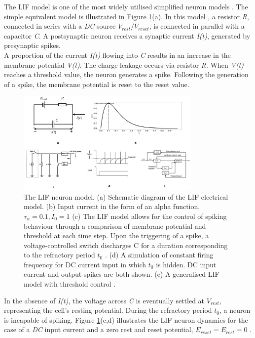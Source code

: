\noindent The LIF model is one of the most widely utilised simplified neuron models \cite{lapique1907researches}. The simple equivalent model is illustrated in Figure \ref{fig:1d}(a). In this model \cite{stein1967frequency}, a resistor \textit{R}, connected in series with a \textit{DC} source $V_{rest}/V_{reset}$, is connected in parallel with a capacitor \textit{C}. A postsynaptic neuron receives a synaptic current \textit{I(t)}, generated by presynaptic spikes. \\

\noindent A proportion of the current \textit{I(t)} flowing into \textit{C} results in an increase in the membrane potential \textit{V(t)}. The charge leakage occurs via resistor \textit{R}. When \textit{V(t)} reaches a threshold value, the neuron generates a spike. Following the generation of a spike, the membrane potential is reset to the reset value. \\

\begin{figure}[htbp!] 
    \centering    
    \includegraphics[width=0.8\textwidth]{Chapter1/Figs/1d.png}
    \caption[The Leaky Integrate-and-Fire neuron model.]{The LIF neuron model. (a) Schematic diagram of the LIF electrical model. (b) Input current in the form of an alpha function, $\tau_{\alpha} = 0.1, I_0 = 1$ (c) The LIF model allows for the control of spiking behaviour through a comparison of membrane potential and threshold at each time step. Upon the triggering of a spike, a voltage-controlled switch discharges C for a duration corresponding to the refractory period $t_0$ \cite{tal1997computing}. (d) A simulation of constant firing frequency for DC current input in which $t_0$ is hidden. DC input current and output spikes are both shown. (e) A generalised LIF model with threshold control \cite{teeter2018generalized}. }
    \label{fig:1d}
\end{figure}

\noindent In the absence of \textit{I(t)}, the voltage across \textit{C} is eventually settled at $V_{rest}$, representing the cell's resting potential. During the refractory period $t_0$, a neuron is incapable of spiking. Figure \ref{fig:1d}(c,d) illustrates the LIF neuron dynamics for the case of a \textit{DC} input current and a zero rest and reset potential, $E_{reset} = E_{rest} = 0$ \cite{tal1997computing}. \\


